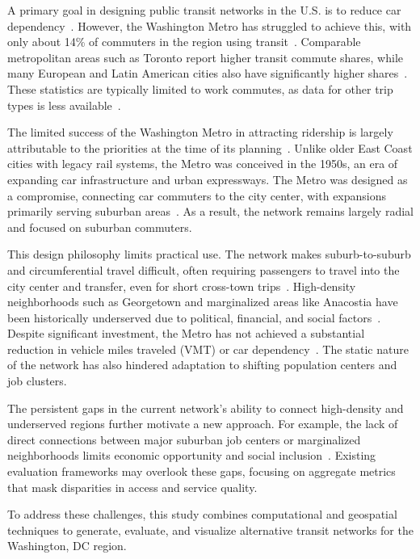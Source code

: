 \documentclass[sigconf,nonacm]{acmart}
\begin{document}
A primary goal in designing public transit networks in the U.S. is to reduce car dependency~\cite{lit:us_transit_policy}. However, the Washington Metro has struggled to achieve this, with only about 14\% of commuters in the region using transit~\cite{lit:commute_stats}. Comparable metropolitan areas such as Toronto report higher transit commute shares, while many European and Latin American cities also have significantly higher shares~\cite{lit:toronto}. These statistics are typically limited to work commutes, as data for other trip types is less available~\cite{lit:commute_stats}.

The limited success of the Washington Metro in attracting ridership is largely attributable to the priorities at the time of its planning~\cite{lit:wmata_history}. Unlike older East Coast cities with legacy rail systems, the Metro was conceived in the 1950s, an era of expanding car infrastructure and urban expressways. The Metro was designed as a compromise, connecting car commuters to the city center, with expansions primarily serving suburban areas~\cite{lit:wmata_history}. As a result, the network remains largely radial and focused on suburban commuters.

This design philosophy limits practical use. The network makes suburb-to-suburb and circumferential travel difficult, often requiring passengers to travel into the city center and transfer, even for short cross-town trips~\cite{lit:wmata_stats}. High-density neighborhoods such as Georgetown and marginalized areas like Anacostia have been historically underserved due to political, financial, and social factors~\cite{lit:equity}. Despite significant investment, the Metro has not achieved a substantial reduction in vehicle miles traveled (VMT) or car dependency~\cite{lit:env}. The static nature of the network has also hindered adaptation to shifting population centers and job clusters.

The persistent gaps in the current network's ability to connect high-density and underserved regions further motivate a new approach. For example, the lack of direct connections between major suburban job centers or marginalized neighborhoods limits economic opportunity and social inclusion~\cite{lit:equity}. Existing evaluation frameworks may overlook these gaps, focusing on aggregate metrics that mask disparities in access and service quality.

To address these challenges, this study combines computational and geospatial techniques to generate, evaluate, and visualize alternative transit networks for the Washington, DC region.
\end{document}

